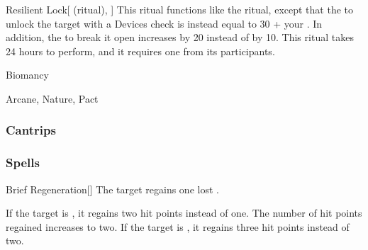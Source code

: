 \lowercase{\hypertarget{spell:Resilient Lock}{}}\label{spell:Resilient Lock}
\begin{attuneability}[Rank 5]{\hypertarget{spell:Resilient Lock}{Resilient Lock}}[ (ritual), ]
This ritual functions like the  ritual, except that the  to unlock the target with a Devices check is instead equal to 30 + your .
In addition, the  to break it open increases by 20 instead of by 10.
This ritual takes 24 hours to perform, and it requires one  from its participants.
\end{attuneability}
\vspace{0.25em}


\newpage
\begin{spellsection}{Biomancy}

\begin{spellheader}
\end{spellheader}


 Arcane, Nature, Pact

\subsubsection{Cantrips}


\end{spellsection}


\subsubsection{Spells}


\lowercase{\hypertarget{spell:Brief Regeneration}{}}\label{spell:Brief Regeneration}
\begin{freeability}[Rank 1]{\hypertarget{spell:Brief Regeneration}{Brief Regeneration}}[]
The target regains one lost .

\rankline
{} If the target is , it regains two hit points instead of one.
 The number of hit points regained increases to two.
 If the target is , it regains three hit points instead of two.

\end{freeability}
\vspace{0.25em}



